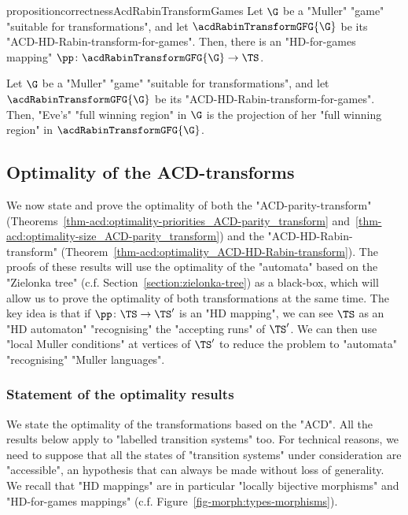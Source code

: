\documentclass{theoretics}
\begin{document}
\begin{restatable}{proposition}{correctnessAcdRabinTransformGames}\label{prop-ACD:correctness_ACD-HD-Rabin-transform-games}
	Let $\G$ be a "Muller" "game" "suitable for transformations", and let $\acdRabinTransformGFG{\G}$ be its "ACD-HD-Rabin-transform-for-games". Then, there is an "HD-for-games mapping" $\pp\colon \acdRabinTransformGFG{\G} \to \TS$.
\end{restatable}
\begin{corollary}
	Let $\G$ be a "Muller" "game" "suitable for transformations", and let $\acdRabinTransformGFG{\G}$ be its "ACD-HD-Rabin-transform-for-games". Then, "Eve's" "full winning region" in $\G$ is the projection of her "full winning region" in $\acdRabinTransformGFG{\G}$.%
\end{corollary}

\subsection{Optimality of the ACD-transforms}\label{subsec-acd-parity: optimality}
We now state and prove the optimality of both the "ACD-parity-transform" (Theorems~\ref{thm-acd:optimality-priorities_ACD-parity_transform} and~\ref{thm-acd:optimality-size_ACD-parity_transform}) and the "ACD-HD-Rabin-transform" (Theorem~\ref{thm-acd:optimality_ACD-HD-Rabin-transform}).
The proofs of these results will use the optimality of the "automata" based on the "Zielonka tree" (c.f. Section~\ref{section:zielonka-tree}) as a black-box, which will allow us to prove the optimality of both transformations at the same time.
The key idea is that if $\pp\colon \TS \to \TS'$ is an "HD mapping", we can see $\TS$ as an "HD automaton" "recognising" the "accepting runs" of $\TS'$. We can then use "local Muller conditions" at vertices of $\TS'$ to reduce the problem to "automata" "recognising" "Muller languages".

\subsubsection{Statement of the optimality results}
We state the optimality of the transformations based on the "ACD". All the results below apply to "labelled transition systems" too.  For technical reasons, we need to suppose that all the states of "transition systems" under consideration are "accessible", an hypothesis that can always be made without loss of generality. We recall that "HD mappings" are in particular "locally bijective morphisms" and "HD-for-games mappings" (c.f. Figure~\ref{fig-morph:types-morphisms}).
\end{document}
